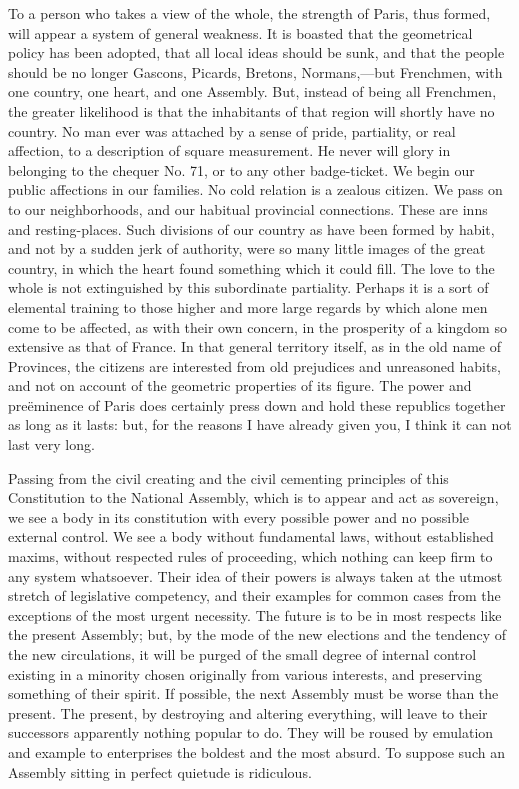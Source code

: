 To a person who takes a view of the whole, the strength of Paris, thus formed, will appear a system of general weakness. It is boasted that the geometrical policy has been adopted, that all local ideas should be sunk, and that the people should be no longer Gascons, Picards, Bretons, Normans,—but Frenchmen, with one country, one heart, and one Assembly. But, instead of being all Frenchmen, the greater likelihood is that the inhabitants of that region will shortly have no country. No man ever was attached by a sense of pride, partiality, or real affection, to a description of square measurement. He never will glory in belonging to the chequer No. 71, or to any other badge-ticket. We begin our public affections in our families. No cold relation is a zealous citizen. We pass on to our neighborhoods, and our habitual provincial connections. These are inns and resting-places. Such divisions of our country as have been formed by habit, and not by a sudden jerk of authority, were so many little images of the great country, in which the heart found something which it could fill. The love to the whole is not extinguished by this subordinate partiality. Perhaps it is a sort of elemental training to those higher and more large regards by which alone men come to be affected, as with their own concern, in the prosperity of a kingdom so extensive as that of France. In that general territory itself, as in the old name of Provinces, the citizens are interested from old prejudices and unreasoned habits, and not on account of the geometric properties of its figure. The power and preëminence of Paris does certainly press down and hold these republics together as long as it lasts: but, for the reasons I have already given you, I think it can not last very long.

Passing from the civil creating and the civil cementing principles of this Constitution to the National Assembly, which is to appear and act as sovereign, we see a body in its constitution with every possible power and no possible external control. We see a body without fundamental laws, without established maxims, without respected rules of proceeding, which nothing can keep firm to any system whatsoever. Their idea of their powers is always taken at the utmost stretch of legislative competency, and their examples for common cases from the exceptions of the most urgent necessity. The future is to be in most respects like the present Assembly; but, by the mode of the new elections and the tendency of the new circulations, it will be purged of the small degree of internal control existing in a minority chosen originally from various interests, and preserving something of their spirit. If possible, the next Assembly must be worse than the present. The present, by destroying and altering everything, will leave to their successors apparently nothing popular to do. They will be roused by emulation and example to enterprises the boldest and the most absurd. To suppose such an Assembly sitting in perfect quietude is ridiculous.

